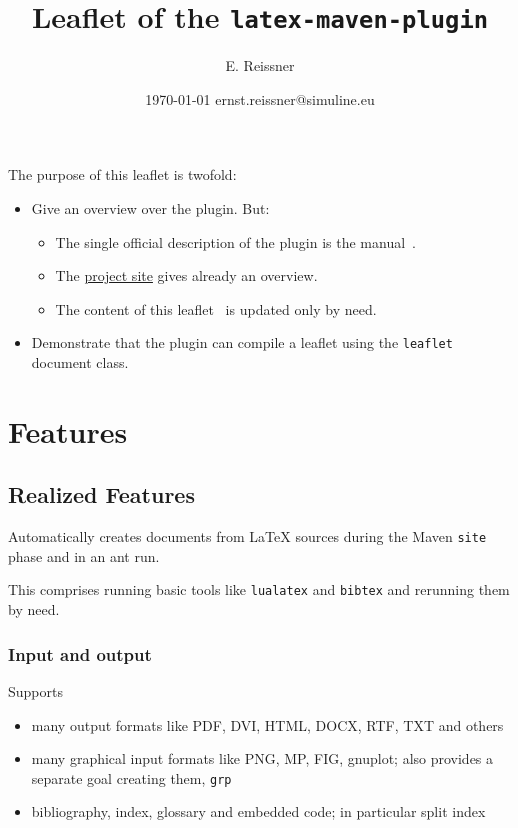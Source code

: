 \documentclass[a4paper,notumble,10pt,english]{leaflet}%
\title{Leaflet of the \texttt{latex-maven-plugin}}
\author{E. Reissner}
\date{\today{} ernst.reissner@simuline.eu}
\begin{document}
\maketitle

The purpose of this leaflet is twofold:
%
\begin{itemize}
  \item Give an overview over the plugin. 
  But: 
  \begin{itemize}
    \item The single official description of the plugin is the manual~\cite{LatexPlugin}.
    \item The 
    \href{http://simuline.eu/LatexMavenPlugin/index.html}{project site} 
    gives already an overview. 
    \item 
    The content of this leaflet~\cite{LeafLeaf} is updated only by need. 
  \end{itemize}
  
  \item Demonstrate that the plugin can compile a leaflet using the \texttt{leaflet} document class. 
\end{itemize}

\section{Features}

\subsection{Realized Features}

Automatically creates documents from LaTeX sources during the Maven \texttt{site} phase 
and in an ant run. 

This comprises running basic tools like \texttt{lualatex} and \texttt{bibtex} 
and rerunning them by need. 

\subsubsection{Input and output}

Supports 
\begin{itemize}
  \item
  many output formats like PDF, DVI, HTML, DOCX, RTF, TXT and others
  \item
  many graphical input formats like PNG, MP, FIG, gnuplot; 
  also provides a separate goal creating them, \texttt{grp} 
  \item
  bibliography, index, glossary and embedded code; in particular split index
\end{itemize}
\end{document}
